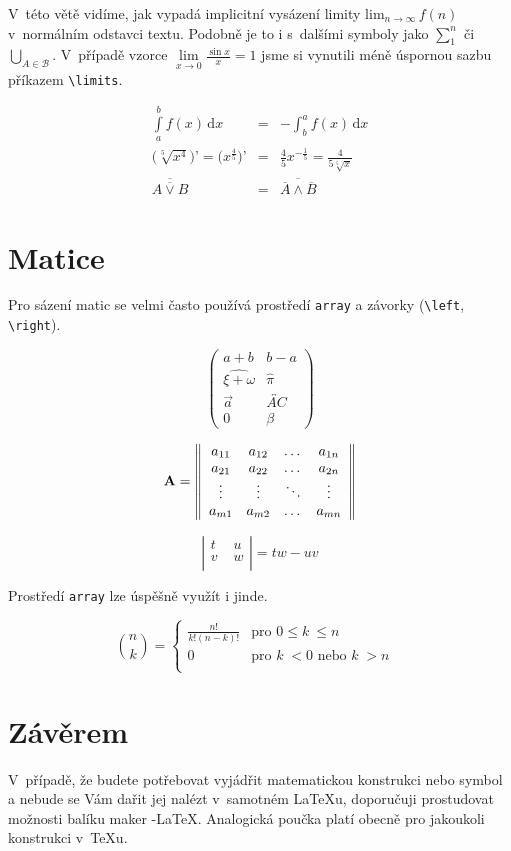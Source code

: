 \documentclass[czech,a4paper,twocolumn,11pt]{article}
\theoremstyle{definition}
\theoremstyle{definition}
\theoremstyle{definition}
\begin{document}
V~této větě vidíme, jak vypadá implicitní vysázení limity $\mathrm{lim}_{n \rightarrow \infty}\,f(n)$ v~normálním odstavci textu. Podobně je to i s~dalšími symboly jako $\sum_1^n$ či $\bigcup_{A \in \mathcal{B}}$. 
V~případě vzorce $\textstyle\lim\limits_{x \to 0} \frac{\sin x}{x}=1$ jsme si vynutili méně úspornou sazbu příkazem \verb|\limits|.

\begin{eqnarray}
\displaystyle\int \limits^b_a f(x)\, \mathrm{d}x &=&-\displaystyle\int^a_b f(x)\, \mathrm{d}x\\
\Big(\sqrt[5]{x^4}\Big)’ = \Big(x^\frac{4}{5}\Big)’ &=& \frac{4}{5}x^{-\frac{1}{5}} = \frac{4}{5\sqrt[5]{x}} \\
\overline{\overline{A \vee B}} &=& \overline{\overline{A} \wedge \overline{B}}
\end{eqnarray}

\section{Matice}

Pro sázení matic se velmi často používá prostředí \texttt{array} a závorky (\verb|\left|, \verb|\right|). 

$$\left( \begin{array}{cc}
a+b & b-a \\
\widehat{\xi + \omega} & \hat{\pi} \\
\vec{a} & \overleftrightarrow{AC}  \\
0 & \beta 
\end{array} \right) $$ 

$$ \mathbf{A} =\hspace{0.0mm} \left\| \begin{array}{cccc}
a_{11} & a_{12} & \dots & a_{1n} \\
a_{21} & a_{22} & \dots & a_{2n} \\
\vdots & \vdots & \ddots & \vdots \\
a_{m1} & a_{m2} & \dots & a_{mn} \end{array} \right\|$$ 

$$\left| \begin{array}{cc}
t \,&\, u \\
v \,&\, w \\
\end{array} \right|
= tw-uv $$

Prostředí \texttt{array} lze úspěšně využít i jinde.

$${n\choose k} = \left\{ \begin{array}{ll}
\frac{n!}{k!(n-k)!} & \mbox{pro $0 \leq k~\leq n$ }\\
0 & \mbox{pro $k\;<0$ nebo $k\;>n$ }\\
\end{array} \right.$$

\section{Závěrem}
V~případě, že budete potřebovat vyjádřit matematickou konstrukci nebo symbol a nebude se Vám dařit jej nalézt v~samotném \LaTeX u, doporučuji prostudovat možnosti balíku maker \AmS-\LaTeX. Analogická poučka platí o\-bec\-ně pro jakoukoli konstrukci v~\TeX u. 
\end{document}
